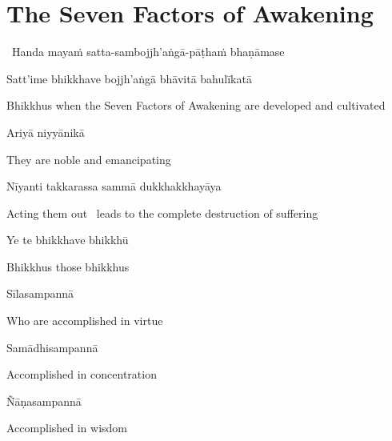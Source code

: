 \suttaRef{[DN 16]}


\section{The Seven Factors of Awakening}
\label{seven-factors-of-awakening}

\begin{leader}
  \anglebracketleft\ \hspace{-0.5mm}Handa mayaṁ satta-sambojjh'aṅgā-pāṭhaṁ bhaṇāmase \hspace{-0.5mm}\anglebracketright\
\end{leader}

Satt'ime bhikkhave bojjh'aṅgā bhāvitā bahulīkatā

\begin{english-hang}
  Bhikkhus when the Seven Factors of Awakening are developed and cultivated
\end{english-hang}

Ariyā niyyānikā

\begin{english}
  They are noble and emancipating
\end{english}

Nīyanti takkarassa sammā dukkhakkhayāya

\begin{english}
  Acting them out \breathmark\ leads to the complete destruction of suffering
\end{english}

\suttaRef{[SN 46.19]}

Ye te bhikkhave bhikkhū

\begin{english}
  Bhikkhus those bhikkhus
\end{english}

Sīlasampannā

\begin{english}
  Who are accomplished in virtue
\end{english}

Samādhisampannā

\begin{english}
  Accomplished in concentration
\end{english}

Ñāṇasampannā

\begin{english}
  Accomplished in wisdom
\end{english}

